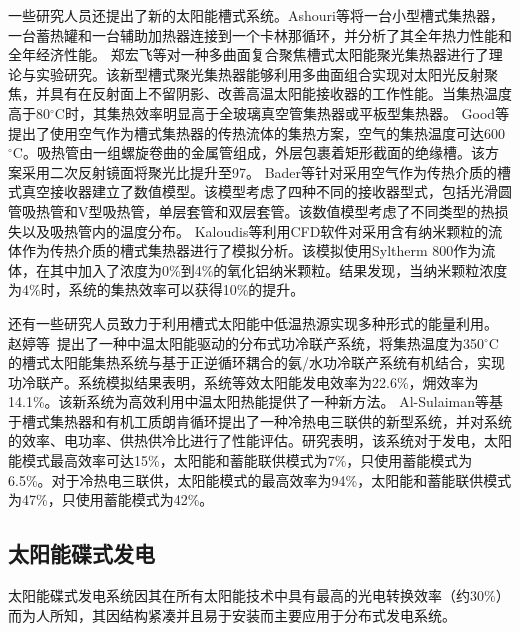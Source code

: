 一些研究人员还提出了新的太阳能槽式系统。Ashouri等\cite{Ashouri2015}将一台小型槽式集热器，一台蓄热罐和一台辅助加热器连接到一个卡林那循环，并分析了其全年热力性能和全年经济性能。
郑宏飞等\cite{Zheng2011}对一种多曲面复合聚焦槽式太阳能聚光集热器进行了理论与实验研究。该新型槽式聚光集热器能够利用多曲面组合实现对太阳光反射聚焦，并具有在反射面上不留阴影、改善高温太阳能接收器的工作性能。当集热温度高于80$\mathrm{^\circ C}$时，其集热效率明显高于全玻璃真空管集热器或平板型集热器。
Good等\cite{Good2016}提出了使用空气作为槽式集热器的传热流体的集热方案，空气的集热温度可达600$\mathrm{^\circ C}$。吸热管由一组螺旋卷曲的金属管组成，外层包裹着矩形截面的绝缘槽。该方案采用二次反射镜面将聚光比提升至97。
Bader等\cite{Bader2015}针对采用空气作为传热介质的槽式真空接收器建立了数值模型。该模型考虑了四种不同的接收器型式，包括光滑圆管吸热管和V型吸热管，单层套管和双层套管。该数值模型考虑了不同类型的热损失以及吸热管内的温度分布。
Kaloudis等\cite{Kaloudis2016}利用CFD软件对采用含有纳米颗粒的流体作为传热介质的槽式集热器进行了模拟分析。该模拟使用Syltherm 800作为流体，在其中加入了浓度为0\%到4\%的氧化铝纳米颗粒。结果发现，当纳米颗粒浓度为4\%时，系统的集热效率可以获得10\%的提升。

还有一些研究人员致力于利用槽式太阳能中低温热源实现多种形式的能量利用。
赵婷等~\cite{Zhao2013}提出了一种中温太阳能驱动的分布式功冷联产系统，将集热温度为350$\mathrm{^\circ C}$的槽式太阳能集热系统与基于正逆循环耦合的氨/水功冷联产系统有机结合，实现功冷联产。系统模拟结果表明，系统等效太阳能发电效率为22.6\%，㶲效率为14.1\%。该新系统为高效利用中温太阳热能提供了一种新方法。
Al-Sulaiman等\cite{AlSulaiman2012}基于槽式集热器和有机工质朗肯循环提出了一种冷热电三联供的新型系统，并对系统的效率、电功率、供热供冷比进行了性能评估。研究表明，该系统对于发电，太阳能模式最高效率可达15\%，太阳能和蓄能联供模式为7\%，只使用蓄能模式为6.5\%。对于冷热电三联供，太阳能模式的最高效率为94\%，太阳能和蓄能联供模式为47\%，只使用蓄能模式为42\%。

\subsection{太阳能碟式发电}
\label{sec:pd}

太阳能碟式发电系统因其在所有太阳能技术中具有最高的光电转换效率（约30\%）而为人所知，其因结构紧凑并且易于安装而主要应用于分布式发电系统。

